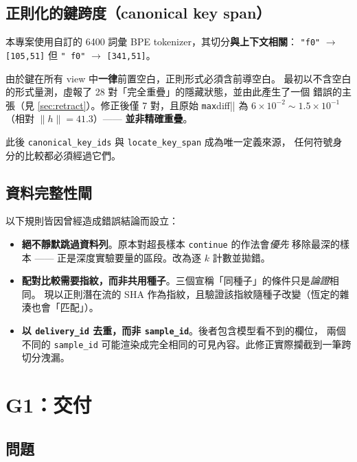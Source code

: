 \documentclass[11pt, a4paper]{article}
\begin{document}
\subsection{正則化的鍵跨度（canonical key span）}

本專案使用自訂的 6400 詞彙 BPE tokenizer，其切分\textbf{與上下文相關}：
\verb|"f0"| $\to$ \verb|[105,51]| 但 \verb|" f0"| $\to$ \verb|[341,51]|。

由於鍵在所有 view 中\textbf{一律}前置空白，正則形式必須含前導空白。
最初以不含空白的形式量測，虛報了 28 對「完全重疊」的隱藏狀態，並由此產生了一個
錯誤的主張（見 \autoref{sec:retract}）。修正後僅 7 對，且原始 \verb|max|diff|| 為
$6\times10^{-2} \sim 1.5\times10^{-1}$（相對 $\|h\| = 41.3$）—— \textbf{並非精確重疊}。

此後 \verb|canonical_key_ids| 與 \verb|locate_key_span| 成為唯一定義來源，
任何符號身分的比較都必須經過它們。

\subsection{資料完整性閘}

以下規則皆因曾經造成錯誤結論而設立：

\begin{itemize}
  \item \textbf{絕不靜默跳過資料列}。原本對超長樣本 \verb|continue| 的作法會\emph{優先}
        移除最深的樣本 —— 正是深度實驗要量的區段。改為逐 $k$ 計數並拋錯。
  \item \textbf{配對比較需要指紋，而非共用種子}。三個宣稱「同種子」的條件只是\emph{論證}相同。
        現以正則潛在流的 SHA 作為指紋，且驗證該指紋隨種子改變（恆定的雜湊也會「匹配」）。
  \item \textbf{以 \texttt{delivery\_id} 去重，而非 \texttt{sample\_id}}。後者包含模型看不到的欄位，
        兩個不同的 \verb|sample_id| 可能渲染成完全相同的可見內容。此修正實際攔截到一筆跨切分洩漏。
\end{itemize}

\section{G1：交付}

\subsection{問題}
\end{document}
